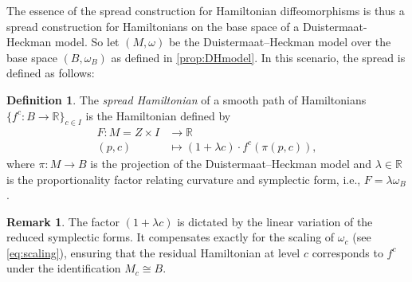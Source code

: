\documentclass[10pt,oneside,reqno]{amsart}
\theoremstyle{definition}
\newtheorem{definition}[theorem]{Definition}
\newtheorem*{remark}{Remark}
\newcommand{\IR}{\mathbb{R}}
\begin{document}
The essence of the spread construction for Hamiltonian diffeomorphisms is thus a spread construction for Hamiltonians on the base space of a Duistermaat-Heckman model. So let $(M,\omega)$ be the Duistermaat--Heckman model over the base space $(B,\omega_B)$ as defined in \cref{prop:DHmodel}. In this scenario, the spread is defined as follows: %
\begin{definition}
     The \textit{spread Hamiltonian} of a smooth path of Hamiltonians $\{f^c:B\to \IR\}_{c\in I}$ is the Hamiltonian defined by
    \begin{align*}
        F:M=Z\times I &\to \IR \\
        (p,c) &\mapsto (1+\lambda c) \cdot f^c(\pi(p,c)),
    \end{align*}
    where $\pi:M\to B$ is the projection of the Duistermaat--Heckman model and $\lambda\in \IR$ is the proportionality factor relating curvature and symplectic form, i.e., $F=\lambda \omega_B$.
\end{definition}

\begin{remark}
    The factor $(1+\lambda c)$ is dictated by the linear variation of the reduced symplectic forms. It compensates exactly for the scaling of $\omega_c$ (see \eqref{eq:scaling}), ensuring that the residual Hamiltonian at level $c$ corresponds to $f^c$ under the identification $M_c \cong B$.
\end{remark}
\end{document}
